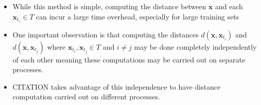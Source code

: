 \begin{itemize}
    \item While this method is simple, computing the distance between $\bm{x}$ and each $\bm{x}_{t_i} \in T$ can incur a large time overhead, especially for large training sets
    \item One important observation is that computing the distances $d \left( \bm{x}, \bm{x}_{t_i} \right)$ and $d \left( \bm{x}, \bm{x}_{t_j} \right)$ where $\bm{x}_{t_i}, \bm{x}_{t_j} \in T$ and $i \neq j$ may be done completely independently of each other meaning these computations may be carried out on separate processes.
    \item CITATION takes advantage of this independence to have distance computation carried out on different processes.
\end{itemize}


